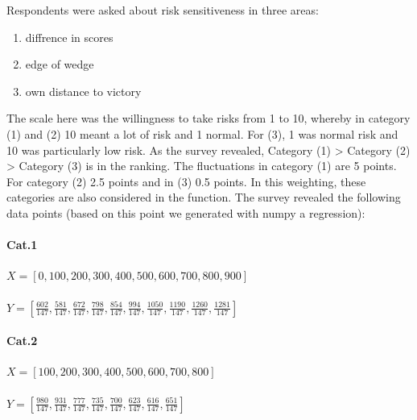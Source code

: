 Respondents were asked about risk sensitiveness in three areas:
\begin{enumerate}[(1)]
\item diffrence in scores
\item edge of wedge
\item own distance to victory
\end{enumerate}
The scale here was the willingness to take risks from 1 to 10, whereby in category (1) and (2) 10 meant a lot of risk and 1 normal. For (3), 1 was normal risk and 10 was particularly low risk.
 As the survey revealed, Category (1) > Category (2) > Category (3) is in the ranking. The fluctuations in category (1) are 5 points.
 For category (2) 2.5 points and in (3) 0.5 points. In this weighting, these categories are also considered in the function.
The survey revealed the following data points (based on this point we generated with numpy a regression):
\paragraph{Cat.1}
$X=[0,100,200,300,400,500,600,700,800,900]$ \\ \\
$Y=[\frac{602}{147},\frac{581}{147},\frac{672}{147},\frac{798}{147},\frac{854}{147},\frac{994}{147},\frac{1050}{147},\frac{1190}{147},\frac{1260}{147},\frac{1281}{147}]$\\
\paragraph{Cat.2}\par
$X=[100,200,300,400,500,600,700,800]$ \\ \\
$Y=[\frac{980}{147},\frac{931}{147},\frac{777}{147},\frac{735}{147},\frac{700}{147},\frac{623}{147},\frac{616}{147},\frac{651}{147}]$\\
